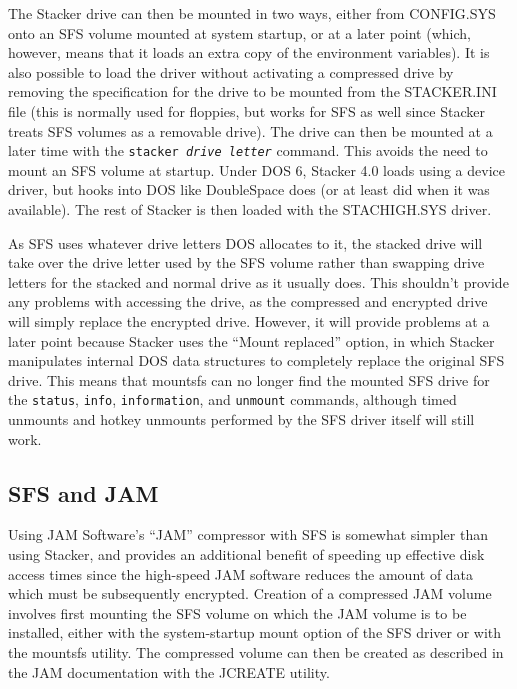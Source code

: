 The Stacker drive can then be mounted in two ways, either from CONFIG.SYS onto
an SFS volume mounted at system startup, or at a later point (which, however, 
means that it loads an extra copy of the environment variables).  It is also 
possible to load the driver without activating a compressed drive by removing 
the specification for the drive to be mounted from the STACKER.INI file (this 
is normally used for floppies, but works for SFS as well since Stacker treats 
SFS volumes as a removable drive).  The drive can then be mounted at a later 
time with the {\tt stacker {\em drive letter}} command.  This avoids the need to mount 
an SFS volume at startup.  Under DOS 6, Stacker 4.0 loads using a device 
driver, but hooks into DOS like DoubleSpace does (or at least did when it was 
available).  The rest of Stacker is then loaded with the STACHIGH.SYS driver.

As SFS uses whatever drive letters DOS allocates to it, the stacked drive will
take over the drive letter used by the SFS volume rather than swapping drive
letters for the stacked and normal drive as it usually does.  This shouldn't
provide any problems with accessing the drive, as the compressed and encrypted
drive will simply replace the encrypted drive.  However, it will provide
problems at a later point because Stacker uses the ``Mount replaced'' option, in
which Stacker manipulates internal DOS data structures to completely replace
the original SFS drive.  This means that mountsfs can no longer find the
mounted SFS drive for the {\tt status}, {\tt info}, {\tt information}, and {\tt unmount}
commands, although timed unmounts and hotkey unmounts performed by the SFS
driver itself will still work.

\subsection{SFS and JAM}

Using JAM Software's ``JAM'' compressor with SFS is somewhat simpler than using
Stacker, and provides an additional benefit of speeding up effective disk
access times since the high-speed JAM software reduces the amount of data which
must be subsequently encrypted.  Creation of a compressed JAM volume involves
first mounting the SFS volume on which the JAM volume is to be installed,
either with the system-startup mount option of the SFS driver or with the
mountsfs utility.  The compressed volume can then be created as described in
the JAM documentation with the JCREATE utility.

